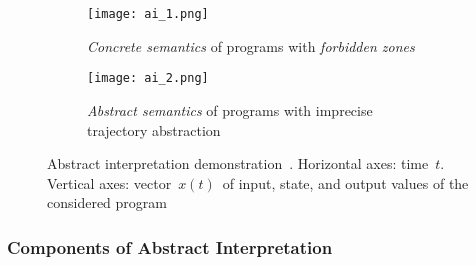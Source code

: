 \begin{figure}[hbt]
    \centering

    \begin{subfigure}[hbt]{.45 \linewidth}
        \centering
        \texttt{[image: ai\_1.png]}
        \caption{%
            \emph{Concrete semantics} of programs with
            \emph{forbidden zones}
        }
        \label{fig:ai1}
    \end{subfigure}
%
    \hfill
%
    \begin{subfigure}[hbt]{.45\linewidth}
        \centering
        \texttt{[image: ai\_2.png]}
        \caption{%
            \emph{Abstract semantics} of programs with imprecise
            trajectory abstraction
        }
        \label{fig:ai2}
    \end{subfigure}

    \caption{%
        Abstract interpretation demonstration~\cite{AIInNutshellCousot}.
        Horizontal axes: time~$ t $. Vertical axes:
        vector~$ x(t) $~of input, state, and output values of the
        considered program
    }
\end{figure}

\subsubsection{Components of Abstract Interpretation}

